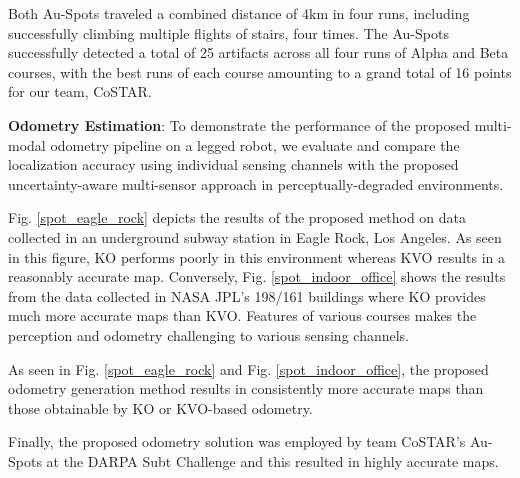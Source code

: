\documentclass[letterpaper, 10pt, conference]{ieeeconf}      %
\newcommand{\ph}[1]{{\textbf{#1}:}} %
\newcommand{\rev}[1]{{\color{blue} #1 }} %
\begin{document}
\rev{Both Au-Spots traveled a combined distance of 4km in four runs, including successfully climbing multiple flights of stairs, four times.}
\rev{The Au-Spots successfully detected a total of 25 artifacts across all four runs of Alpha and Beta courses, with the best runs of each course amounting to a grand total of 16 points for our team, CoSTAR.}

\ph{Odometry Estimation}
To demonstrate the performance of the proposed multi-modal odometry pipeline on a legged robot, we evaluate and compare the localization accuracy using individual sensing channels with the proposed uncertainty-aware multi-sensor approach in perceptually-degraded environments. 

Fig. \ref{spot_eagle_rock} depicts the results of the proposed method on data collected in an underground subway station in Eagle Rock, Los Angeles. As seen in this figure, KO performs poorly in this environment whereas KVO results in a reasonably accurate map. %
Conversely, Fig. \ref{spot_indoor_office} shows the results from the data collected in NASA JPL's 198/161 buildings where KO provides much more accurate maps than KVO. Features of various courses makes the perception and odometry challenging to various sensing channels. 

\rev{As seen in Fig. \ref{spot_eagle_rock} and Fig. \ref{spot_indoor_office},}the proposed odometry generation method results in consistently more accurate maps than those obtainable by KO or KVO-based odometry. %

Finally, the proposed odometry solution was employed by team CoSTAR's Au-Spots at the DARPA Subt Challenge and this resulted in highly accurate maps.

\end{document}
